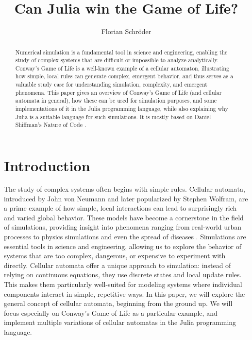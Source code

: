 \documentclass[a4paper,12pt]{llncs}
\numberwithin{equation}{section}
\begin{document}

%
\author{Florian Schröder}
%
\title{Can Julia win the Game of Life?}
%
%
\maketitle              %
\thispagestyle{empty}
%
%
\begin{abstract}
  Numerical simulation is a fundamental tool in science and engineering, enabling the study of complex systems that are difficult or impossible to analyze analytically.
  Conway's Game of Life is a well-known example of a cellular automaton, illustrating how simple, local rules can generate complex, emergent behavior, and thus serves as a valuable study case for understanding simulation, complexity, and emergent phenomena.
  This paper gives an overview of Conway's Game of Life (and cellular automata in general), how these can be used for simulation purposes, and some implementations of it in the Julia programming language, while also explaining why Julia is a suitable language for such simulations.
  It is mostly based on Daniel Shiffman's Nature of Code \cite{NOC}.
\end{abstract}


\section{Introduction}
The study of complex systems often begins with simple rules.
Cellular automata, introduced by John von Neumann and later popularized by Stephen Wolfram, are a prime example of how simple, local interactions can lead to surprisingly rich and varied global behavior.
These models have become a cornerstone in the field of simulations, providing insight into phenomena ranging from real-world urban processes \cite{SANTE2010108} to physics simulations \cite{VICHNIAC198496} and even the spread of diseases \cite{SLIMI20091072}.
Simulations are essential tools in science and engineering, allowing us to explore the behavior of systems that are too complex, dangerous, or expensive to experiment with directly.
Cellular automata offer a unique approach to simulation: instead of relying on continuous equations, they use discrete states and local update rules.
This makes them particularly well-suited for modeling systems where individual components interact in simple, repetitive ways.
In this paper, we will explore the general concept of cellular automata, beginning from the ground up. We will focus especially on Conway's Game of Life as a particular example, and implement multiple variations of cellular automatas in the Julia programming language.
\end{document}
